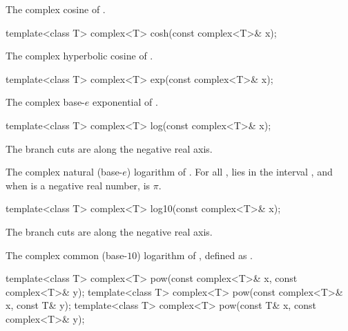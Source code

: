 \begin{itemdescr}
\pnum
\returns
The complex cosine of .
\end{itemdescr}

%
\begin{itemdecl}
template<class T> complex<T> cosh(const complex<T>& x);
\end{itemdecl}

\begin{itemdescr}
\pnum
\returns
The complex hyperbolic cosine of .
\end{itemdescr}

%
\begin{itemdecl}
template<class T> complex<T> exp(const complex<T>& x);
\end{itemdecl}

\begin{itemdescr}
\pnum
\returns
The complex base-$e$ exponential of .
\end{itemdescr}

%
\begin{itemdecl}
template<class T> complex<T> log(const complex<T>& x);
\end{itemdecl}

\begin{itemdescr}
\pnum
\remarks
The branch cuts are along the negative real axis.

\pnum
\returns
The complex natural (base-$e$) logarithm of . For all ,
 lies in the interval \crange{$-\pi$}{$\pi$}, and
when  is a negative real number,  is $\pi$.
\end{itemdescr}

%
\begin{itemdecl}
template<class T> complex<T> log10(const complex<T>& x);
\end{itemdecl}

\begin{itemdescr}
\pnum
\remarks
The branch cuts are along the negative real axis.

\pnum
\returns
The complex common (base-$10$) logarithm of , defined as
.
\end{itemdescr}

%
\begin{itemdecl}
template<class T> complex<T> pow(const complex<T>& x, const complex<T>& y);
template<class T> complex<T> pow(const complex<T>& x, const T& y);
template<class T> complex<T> pow(const T& x, const complex<T>& y);
\end{itemdecl}

